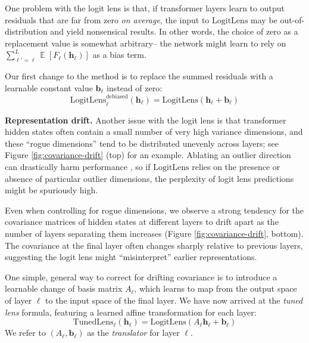 \documentclass{article}
\theoremstyle{plain}
\theoremstyle{definition}
\newcommand{\E}{\mathop{\mathbb{E}}}      %
\newcommand{\hh}{\boldsymbol h} %
\begin{document}
One problem with the logit lens is that, if transformer layers learn to output residuals that are far from zero \emph{on average}, the input to $\mathrm{LogitLens}$ may be out-of-distribution and yield nonsensical results. In other words, the choice of zero as a replacement value is somewhat arbitrary-- the network might learn to rely on $\sum_{\ell'=\ell}^{L} \E[F_{\ell}(\hh_{\ell})]$ as a bias term.

Our first change to the method is to replace the summed residuals with a learnable constant value $\mathbf{b}_{\ell}$ instead of zero:
\begin{equation}
    \mathrm{LogitLens}^{\mathrm{debiased}}_{\ell}(\hh_{\ell}) = \mathrm{LogitLens}(\hh_{\ell} + \mathbf{b}_{\ell})
\end{equation}

\textbf{Representation drift.} Another issue with the logit lens is that transformer hidden states often contain a small number of very high variance dimensions, and these ``rogue dimensions'' \citep{timkey2021all} tend to be distributed unevenly across layers; see Figure \ref{fig:covariance-drift} (top) for an example. Ablating an outlier direction can drastically harm performance \citep{kovaleva2021bert}, so if $\mathrm{LogitLens}$ relies on the presence or absence of particular outlier dimensions, the perplexity of logit lens predictions might be spuriously high.

Even when controlling for rogue dimensions, we observe a strong tendency for the covariance matrices of hidden states at different layers to drift apart as the number of layers separating them increases (Figure \ref{fig:covariance-drift}, bottom). The covariance at the final layer often changes sharply relative to previous layers, suggesting the logit lens might ``misinterpret'' earlier representations.

One simple, general way to correct for drifting covariance is to introduce a learnable change of basis matrix $A_{\ell}$, which learns to map from the output space of layer $\ell$ to the input space of the final layer. We have now arrived at the \emph{tuned lens} formula, featuring a learned affine transformation for each layer:
\begin{equation}
    \mathrm{TunedLens}_{\ell}(\hh_{\ell}) = \mathrm{LogitLens}(A_{\ell}\hh_{\ell} + \mathbf{b}_{\ell})
\end{equation}
We refer to $(A_{\ell}, \mathbf{b}_{\ell})$ as the \emph{translator} for layer $\ell$.
\end{document}
